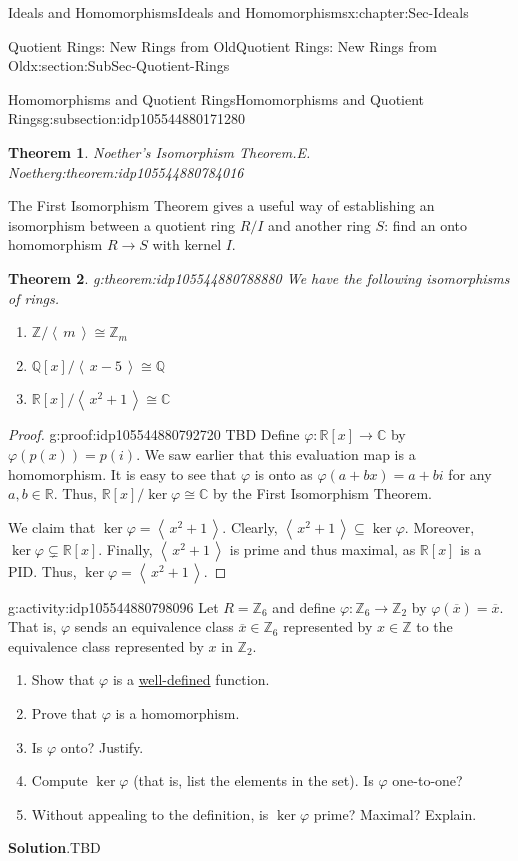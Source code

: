 \documentclass[oneside,10pt,]{book}
\newcommand{\blocktitlefont}{\relax}
\numberwithin{equation}{section}
\newcommand{\ideal}[1]{\left\langle\, #1 \,\right\rangle}
\def\p{\varphi}
\def\C{{\mathbb C}}
\def\Z{{\mathbb Z}}
\def\Q{{\mathbb Q}}
\def\R{{\mathbb R}}
\newtheorem{theorem}{Theorem}[section]
\begin{document}
\begin{chapterptx}{Ideals and Homomorphisms}{}{Ideals and Homomorphisms}{}{}{x:chapter:Sec-Ideals}
\begin{sectionptx}{Quotient Rings: New Rings from Old}{}{Quotient Rings: New Rings from Old}{}{}{x:section:SubSec-Quotient-Rings}
\begin{subsectionptx}{Homomorphisms and Quotient Rings}{}{Homomorphisms and Quotient Rings}{}{}{g:subsection:idp105544880171280}
\begin{theorem}{Noether's Isomorphism Theorem.}{E. Noether}{g:theorem:idp105544880784016}
\end{theorem}
The First Isomorphism Theorem gives a useful way of establishing an isomorphism between a quotient ring \(R/I\) and another ring \(S\): find an onto homomorphism \(R\to S\) with kernel \(I\).%
\begin{theorem}{}{}{g:theorem:idp105544880788880}%
We have the following isomorphisms of rings.%
\begin{enumerate}
\item{}\(\displaystyle \Z/\ideal{m} \cong \Z_m\)%
\item{}\(\displaystyle \Q[x]/\ideal{x-5} \cong \Q\)%
\item{}\(\displaystyle \R[x]/\ideal{x^2+1} \cong \C\)%
\end{enumerate}
%
\end{theorem}
\begin{proof}{}{g:proof:idp105544880792720}
TBD Define \(\p: \R[x] \to \C\) by \(\p(p(x)) = p(i)\). We saw earlier that this evaluation map is a homomorphism. It is easy to see that \(\p\) is onto as \(\p(a+bx) = a+bi\) for any \(a,b\in \R\). Thus, \(\R[x]/\ker\p \cong \C\) by the First Isomorphism Theorem.%
\par
We claim that \(\ker\p = \ideal{x^2+1}\). Clearly, \(\ideal{x^2+1} \subseteq \ker\p\). Moreover, \(\ker\p \subsetneq \R[x]\). Finally, \(\ideal{x^2+1}\) is prime and thus maximal, as \(\R[x]\) is a PID. Thus, \(\ker\p = \ideal{x^2+1}\).%
\end{proof}
\begin{activity}{}{g:activity:idp105544880798096}%
Let \(R = \Z_6\) and define \(\p : \Z_6 \to \Z_2\) by \(\p(\overline{x}) = \overline{x}\). That is, \(\p\) sends an equivalence class \(\overline{x}\in \Z_6\) represented by \(x\in \Z\) to the equivalence class represented by \(x\) in \(\Z_2\).%
%
\begin{enumerate}
\item{}Show that \(\p\) is a \hyperref[x:definition:def-well-defined]{well-defined} function.%
\item{}Prove that \(\p\) is a homomorphism.%
\item{}Is \(\p\) onto? Justify.%
\item{}Compute \(\ker\p\) (that is, list the elements in the set). Is \(\p\) one-to-one?%
\item{}Without appealing to the definition, is \(\ker\p\) prime? Maximal? Explain.%
\end{enumerate}
\par\smallskip%
\noindent\textbf{\blocktitlefont Solution}.\hypertarget{g:solution:idp105544880740752}{}\quad{}TBD\end{activity}%
\end{subsectionptx}
\end{sectionptx}
\end{chapterptx}
\end{document}
